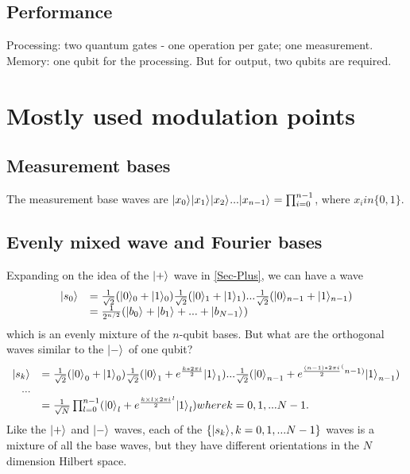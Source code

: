 \documentclass[Letter,11pt]{book}
\begin{document}
\subsection{Performance}
Processing: two quantum gates - one operation per gate; one measurement.
Memory: one qubit for the processing. But for output, two qubits are required.


\section{Mostly used modulation points}
\subsection{Measurement bases}
The measurement base waves are $\keta{x_0}\keta{x_1}\keta{x_2} ...\keta{x_{n-1}}=\prod^{n-1}_{i=0}$, where $x_i in \{0, 1\}$.

\subsection{Evenly mixed wave and Fourier bases}
Expanding on the idea of the $\keta{+}$ wave in \ref{Sec-Plus}, we can have a wave
\begin{equation}
\begin{array}{rl}
    \keta{s_0} &= \frac 1 {\sqrt{2}} (\keta[0]{0}+\keta[0]{1}) \frac 1 {\sqrt{2}} (\keta[1]{0}+\keta[1]{1})
    ... \frac 1 {\sqrt{2}} (\keta[n-1]{0}+\keta[n-1]{1}) \\
    &= \frac 1 {2^{n/2}} (\keta{b_0}+\keta{b_1}+...+\keta{b_{N-1}})
 \end{array}
\end{equation}
which is an evenly mixture of the $n$-qubit bases. But what are the orthogonal waves similar to the $\keta{-}$ of one qubit?
\begin{equation}
\begin{array}{rl}
\keta{s_k} &= \frac 1 {\sqrt{2}} ({\keta{0}}_0+{\keta{1}}_0)
    \frac 1 {\sqrt{2}} ({\keta{0}}_1+e^{\frac {k*2 \pi i} 2}{\keta{1}}_1)
    ...  \frac 1 {\sqrt{2}} ({\keta{0}}_{n-1}+e^{\frac {(n-1)*2\pi i} 2^(n-1)}{\keta{1}}_{n-1}) \\
    ... \\
    &= \frac 1 {\sqrt{N}} \prod^{n-1}_{l=0} ({\keta{0}}_l+e^{\frac {k\times l \times 2\pi i} 2^l}{\keta{1}}_l) where k=0, 1, ...N-1.
\end{array}
\end{equation}
Like the $\keta{+}$ and $\keta{-}$ waves, each of the $\{\keta{s_k}, k=0, 1, ... N-1\}$ waves is a mixture of all the base waves, but they have different orientations in the $N$ dimension Hilbert space.
\end{document}
